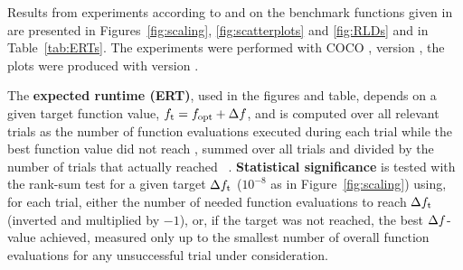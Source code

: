 \documentclass[sigconf]{acmart}
\begin{document}
Results from experiments according to \cite{hansen2016exp} and \cite{hansen2016perfass} on the benchmark
functions given in \cite{wp200901_2010,hansen2010fun} are presented in
Figures~\ref{fig:scaling}, \ref{fig:scatterplots} and \ref{fig:RLDs} and
in Table~\ref{tab:ERTs}. The experiments were performed with COCO \cite{hansen2020cocoplat},
version \change{\version}, the plots were produced with version \change{\version}.

The \textbf{expected runtime (ERT)}, used in the figures and table, depends on a
given target function value, $f_\mathrm{t}=f_\mathrm{opt}+\Delta f$, and is computed over all relevant trials
as the number of function evaluations executed during each trial while the best
function value did not reach \ftarget, summed over all trials
and divided by the number of trials that actually reached \ftarget\
\cite{hansen2010exp,price1997dev}.
\textbf{Statistical significance} is tested with the rank-sum test for a given
target $\Delta f_\mathrm{t}$ ($10^{-8}$ as in Figure~\ref{fig:scaling}) using,
for each trial, either the number of needed function evaluations to reach
$\Delta f_\mathrm{t}$ (inverted and multiplied by $-1$), or, if the target was not
reached, the best $\Delta f$-value achieved, measured only up to the smallest number
of overall function evaluations for any unsuccessful trial under consideration.



\end{document}
